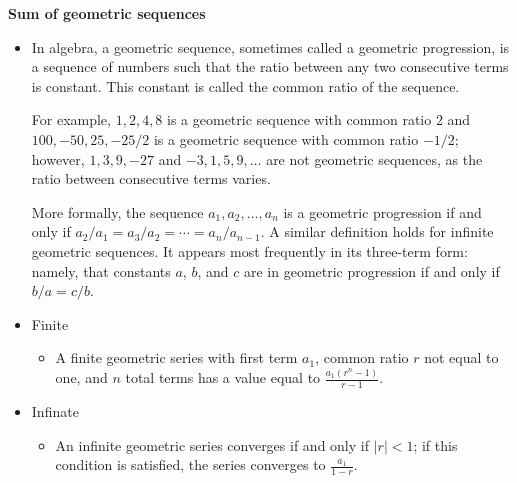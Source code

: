 \documentclass[11pt,letterpaper]{article}
\begin{document}
\vspace{0.4cm}
\begin{minipage}{\textwidth}
     \noindent \textbf{Sum of geometric sequences}
     \begin{itemize}
          \item In algebra, a geometric sequence, sometimes called a geometric progression, is a sequence of numbers such that the ratio between any two consecutive terms is constant. This constant is called the common ratio of the sequence.

          For example, $1, 2, 4, 8$ is a geometric sequence with common ratio $2$ and $100, -50, 25, -25/2$ is a geometric sequence with common ratio $-1/2$; however, $1, 3, 9, -27$ and $-3, 1, 5, 9, \ldots$ are not geometric sequences, as the ratio between consecutive terms varies.
          
          More formally, the sequence $a_1, a_2, \ldots , a_n$ is a geometric progression if and only if $a_2 / a_1 = a_3 / a_2 = \cdots = a_n / a_{n-1}$. A similar definition holds for infinite geometric sequences. It appears most frequently in its three-term form: namely, that constants $a$, $b$, and $c$ are in geometric progression if and only if $b / a = c / b$.
          \item Finite
          \begin{itemize}
               \item A finite geometric series with first term $a_1$, common ratio $r$ not equal to one, and $n$ total terms has a value equal to $\frac{a_1(r^n-1)}{r-1}$.
          \end{itemize}
          \item Infinate 
          \begin{itemize}
               \item An infinite geometric series converges if and only if $|r|<1$; if this condition is satisfied, the series converges to $\frac{a_1}{1-r}$.
          \end{itemize}
     \end{itemize}
\end{minipage}
\end{document}
